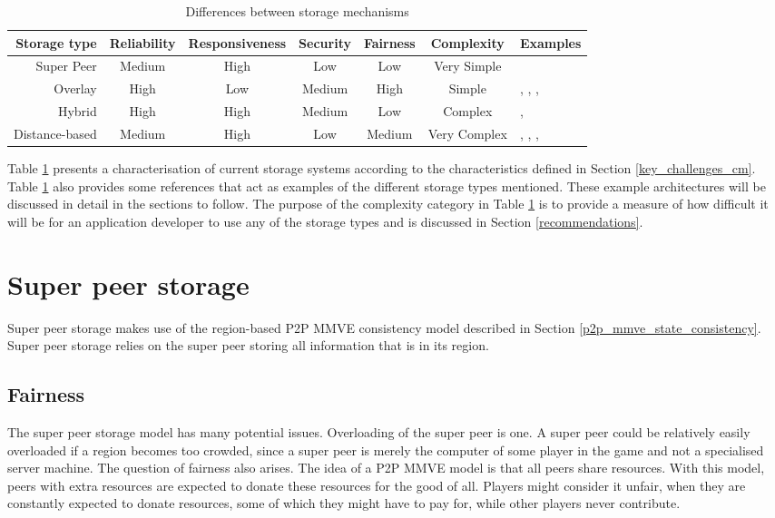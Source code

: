 \begin{table}[htbp]
\centering
\begin{tabular}{|r|c|c|c|c|c|l|}
\hline
Storage type & Reliability & Responsiveness & Security & Fairness & Complexity & Examples\\
\hline
Super Peer & Medium & High & Low & Low & Very Simple & \cite{knutsson_p2p_first}\\
Overlay & High & Low & Medium & High & Simple & \cite{Douglas05enablingmassively}, \cite{using_freenet_storage},
\cite{Fan_phd}, \cite{past_storage_focus}\\
Hybrid & High & High & Medium & Low & Complex & \cite{zoned_federation}, \cite{hybrid_storage1}\\
Distance-based & Medium & High & Low & Medium & Very Complex & \cite{Buyukkaya_voronoi_state_management}, \cite{Hu_voronoi_IM},
\cite{colyseus_distance_based}, \cite{solipsis}\\
\hline
\end{tabular}
\caption{Differences between storage mechanisms} \label{tab_storage}
\end{table}
%
Table \ref{tab_storage} presents a characterisation of current storage systems according to the characteristics defined in Section
\ref{key_challenges_cm}. Table \ref{tab_storage} also provides some references that act as examples of the different storage types mentioned. These
example architectures will be discussed in detail in the sections to follow. The purpose of the complexity category in Table \ref{tab_storage} is to
provide a measure of how difficult it will be for an application developer to use any of the storage types and is discussed in Section
\ref{recommendations}.

\section{Super peer storage}
\label{super_peer_storage}

Super peer storage makes use of the region-based P2P MMVE consistency model described in Section \ref{p2p_mmve_state_consistency}. Super peer storage relies on the super peer storing all information that is in its region.

\subsection{Fairness}
The super peer storage model has many potential issues. Overloading of the super peer is one. A super peer could be relatively easily overloaded if a
region becomes too crowded, since a super peer is merely the computer of some player in the game and not a specialised server machine. The question
of fairness also arises. The idea of a P2P MMVE model is that all peers share resources. With this model, peers with extra resources are expected to
donate these resources for the good of all. Players might consider it unfair, when they are constantly expected to donate resources, some of which
they might have to pay for, while other players never contribute.

